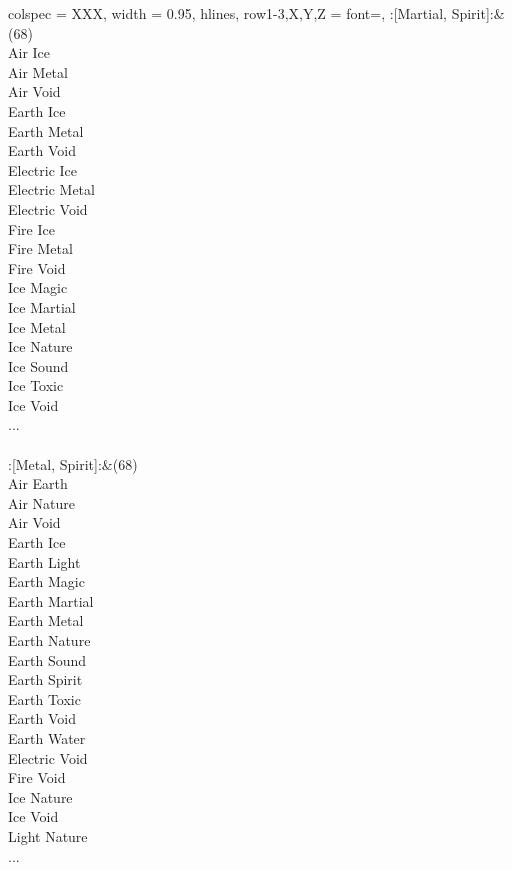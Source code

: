 \begin{longtblr}[
	caption = {2v2 Defending Weak},
	label = {2v2-Defending-Weak},
]{
	colspec = {XXX}, width = 0.95\linewidth,
	hlines,
	row{1-3,X,Y,Z} = {font=\bfseries},
}
	:[Martial, Spirit]:&{(68)\\
	Air Ice \\
	Air Metal \\
	Air Void \\
	Earth Ice \\
	Earth Metal \\
	Earth Void \\
	Electric Ice \\
	Electric Metal \\
	Electric Void \\
	Fire Ice \\
	Fire Metal \\
	Fire Void \\
	Ice Magic \\
	Ice Martial \\
	Ice Metal \\
	Ice Nature \\
	Ice Sound \\
	Ice Toxic \\
	Ice Void \\
	...\\
	}\\

	:[Metal, Spirit]:&{(68)\\
	Air Earth \\
	Air Nature \\
	Air Void \\
	Earth Ice \\
	Earth Light \\
	Earth Magic \\
	Earth Martial \\
	Earth Metal \\
	Earth Nature \\
	Earth Sound \\
	Earth Spirit \\
	Earth Toxic \\
	Earth Void \\
	Earth Water \\
	Electric Void \\
	Fire Void \\
	Ice Nature \\
	Ice Void \\
	Light Nature \\
	...\\
	}\\


\end{longtblr}
